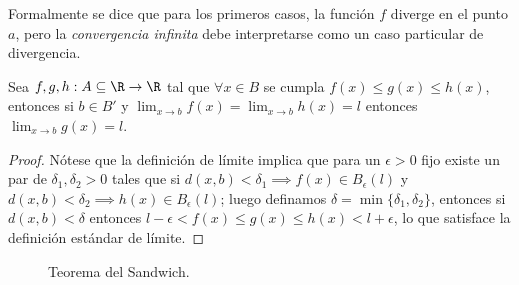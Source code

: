 \documentclass[11pt,oneside,a4paper]{book}
\begin{document}
Formalmente se dice que para los primeros casos, la función $f$ diverge en el punto $a$, pero la \textit{convergencia infinita} debe interpretarse como un caso particular de divergencia.
\begin{thm}
Sea $f,g,h:A\subseteq\R\rightarrow\R$ tal que $\forall x\in B$ se cumpla $f(x)\leq g(x)\leq h(x)$, entonces si $b\in B'$ y $\lim_{x\to b}f(x)=\lim_{x\to b}h(x)=l$ entonces $\lim_{x\to b}g(x)=l$.
\end{thm}
\begin{proof}
Nótese que la definición de límite implica que para un $\epsilon\gt 0$ fijo existe un par de $\delta_1,\delta_2\gt 0$ tales que si $d(x,b)\lt\delta_1\implies f(x)\in B_\epsilon(l)$ y $d(x,b)\lt\delta_2\implies h(x)\in B_\epsilon(l)$; luego definamos $\delta=\min\{\delta_1,\delta_2\}$, entonces si $d(x,b)\lt\delta$ entonces $l-\epsilon\lt f(x)\leq g(x)\leq h(x)\lt l+\epsilon$, lo que satisface la definición estándar de límite.
\end{proof}
\begin{figure}
\centering
{}
\caption{Teorema del Sandwich.}
\end{figure}
\end{document}

